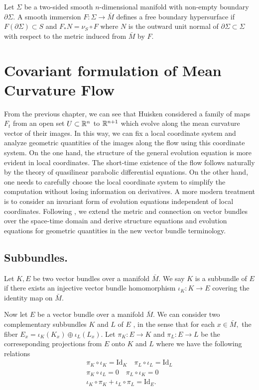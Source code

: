 Let $\Sigma $ be a two-sided smooth $n$-dimensional manifold with non-empty boundary $\partial \Sigma $. A smooth immersion $F \colon \Sigma \to  \bar{M}$ defines a free boundary hypersurface if $F(\partial \Sigma ) \subset S$ and $F_* N = \nu _S \circ F$ where $N$ is the outward unit normal of $\partial \Sigma \subset \Sigma $ with respect to the metric induced from $\bar{M}$ by $F$.




\section{Covariant formulation of Mean Curvature Flow}

From the previous chapter, we can see that Huisken considered a family of maps $F_t$ from an open set $U \subset \mathbb{R}^n$ to $\mathbb{R}^{n+1}$ which evolve along the mean curvature vector of their images. In this way, we can fix a local coordinate system and analyze geometric quantities of the images along the flow using this coordinate system. On the one hand, the structure of the general evolution equation is more evident in local coordinates. The short-time existence of the flow follows naturally by the theory of quasilinear parabolic differential equations. On the other hand, one needs to carefully choose the local coordinate system to simplify the computation without losing information on derivatives. A more modern treatment is to consider an invariant form of evolution equations independent of local coordinates. Following \cite[Section 2]{andrews_mean_2010}, we extend the metric and connection on vector bundles over the space-time domain and derive structure equations and evolution equations for geometric quantities in the new vector bundle terminology.

\subsection{Subbundles.} \label{sec: sb}

\begin{definition}
    Let $K, E$ be two vector bundles over a manifold $\bar{M}$. We say $K$ is a subbundle of $E$ if there exists an injective vector bundle homomorphism $\iota_K \colon K \to E$ covering the identity map on $\bar{M}$.
\end{definition}

Now let $E$ be a vector bundle over a manifold $\bar{M}$. We can consider two complementary subbundles $K$ and $L$ of $E$ , in the sense that for each $x \in \bar{M},$ the fiber $E_x=\iota_K(K_x) \oplus \iota_L(L_x)$. Let $\pi _K \colon E \to K$ and $\pi _L \colon E \to L$ be the correseponding projections from $E$ onto $K$ and $L$ where we have the following relations
\begin{gather*}
    \pi _K \circ \iota _K= \mathrm{Id}_K \quad \pi _L \circ \iota _L=\mathrm{Id}_L\\
    \pi _K \circ \iota _L=0 \quad \pi _L \circ \iota _K=0\\
    \iota _K \circ \pi _K + \iota _L \circ \pi _L = \mathrm{Id}_E.
\end{gather*}

